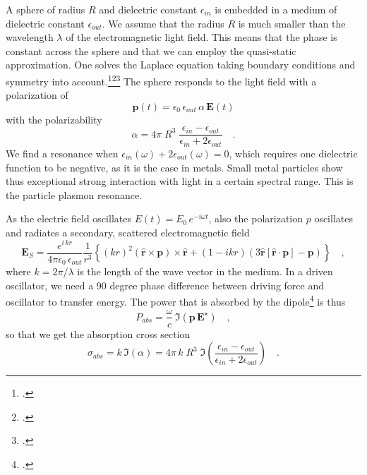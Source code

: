 A sphere of radius $R$ and dielectric constant $\epsilon_{in}$ is embedded in a medium of dielectric constant $\epsilon_{out}$. We assume that the radius $R$ is much smaller than the wavelength $\lambda$ of the electromagnetic light field. This means that the phase is constant across the sphere and that we can employ the quasi-static approximation. One solves the Laplace equation taking  boundary conditions and symmetry into account.\footcite{Jackson-ED}\footcite[excercise 2.4.2]{Nolting-ED}\footcite[chapter 5.2]{BH-book}
The sphere responds to the light field with a polarization of
\begin{equation}
 \mathbf{p}(t) = \epsilon_0 \,  \epsilon_{out} \, \alpha \, \mathbf{E}(t)
\end{equation}
with the polarizability
\begin{equation}
 \alpha = 4 \pi  \; R^3 \; \frac{\epsilon_{in} - \epsilon_{out}}{\epsilon_{in} + 2 \epsilon_{out}} \quad .
\end{equation}
We find a resonance when $\epsilon_{in}(\omega) + 2 \epsilon_{out}(\omega) = 0$, which requires one dielectric function to be negative, as it is the case in metals. Small metal particles show thus exceptional strong interaction with light in a certain spectral range. This is the particle plasmon resonance.

As the electric field oscillates $E(t) = E_0 \, e^{-i \omega t}$, also the polarization $p$ oscillates and radiates a secondary, scattered electromagnetic field 
\begin{equation}
  \mathbf{E}_S = \frac{ e^{i \, k  r} }{4\pi\epsilon_0 \, \epsilon_{out}}  \frac{1}{r^3}\left\{
      (k r )^2 \left( \hat{\mathbf{r}} \times \mathbf{p} \right) \times \hat{\mathbf{r}} +
      \left( 1 -  i k r \right)
        \left( 3\hat{\mathbf{r}} \left[\hat{\mathbf{r}} \cdot \mathbf{p}\right] - \mathbf{p} \right)
    \right\} \quad ,
     \label{eq:5_hybrid_Escat}
\end{equation}
where $k = 2 \pi / \lambda$ is the length of the wave vector in the medium. In a driven oscillator, we need a 90 degree phase difference between driving force and oscillator to transfer energy. The power that is absorbed by the dipole\footcite[Chapter 8]{Novotny-Hecht2012} is thus
\begin{equation}
 P_{abs} = \frac{\omega}{c} \, \Im \left( \mathbf{p} \, \mathbf{E}^\star \right)  \quad ,
\end{equation}
so that we get the absorption cross section
\begin{equation}
 \sigma_{abs} = k \, \Im ( \alpha ) =  4 \pi \, k \; R^3 \; \Im \left( \frac{\epsilon_{in} - \epsilon_{out}}{\epsilon_{in} + 2 \epsilon_{out}} \right) \quad .
 \label{eq:5_hybrid_sigma_abs}
\end{equation}


